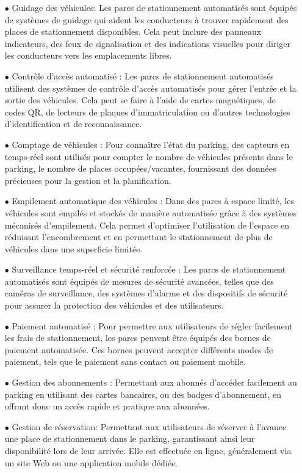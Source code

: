 \begin{enumerate}
   \item [$\bullet$]  Guidage des véhicules: Les parcs de stationnement automatisés sont équipés de systèmes de guidage qui aident les conducteurs à trouver rapidement des places de stationnement disponibles. Cela peut inclure des panneaux indicateurs, des feux de signalisation et des indications visuelles pour diriger les conducteurs vers les emplacements libres.
    \item [$\bullet$]  Contrôle d'accès automatisé : Les parcs de stationnement automatisés utilisent des systèmes de contrôle d'accès automatisés pour gérer l'entrée et la sortie des véhicules. Cela peut se faire à l'aide de cartes magnétiques, de codes QR, de lecteurs de plaques d'immatriculation ou d'autres technologies d'identification et de reconnaissance.
     \item [$\bullet$] Comptage de véhicules : Pour connaître l'état du parking, des capteurs en temps-réel sont utilisés pour compter le nombre de véhicules présents dans le parking, le nombre de places occupées/vacantes, fournissant des données précieuses pour la gestion et la planification.
   \item [$\bullet$] Empilement automatique des véhicules : Dans des parcs à espace limité, les véhicules sont empilés et stockés de manière automatisée grâce à des systèmes mécanisés d'empilement. Cela permet d'optimiser l'utilisation de l'espace en réduisant l'encombrement et en permettant le stationnement de plus de véhicules dans une superficie limitée.
    \item [$\bullet$] Surveillance temps-réel et sécurité renforcée : Les parcs de stationnement automatisés sont équipés de mesures de sécurité avancées, telles que des caméras de surveillance, des systèmes d'alarme et des dispositifs de sécurité pour assurer la protection des véhicules et des utilisateurs.
    \item [$\bullet$] Paiement automatisé : Pour permettre 
   aux utilisateurs de régler facilement les frais de stationnement, les parcs peuvent être équipés des bornes de paiement automatisée.
   Ces bornes peuvent accepter différents modes de paiement, tels que 
   le paiement sans contact ou paiement mobile.
   \item [$\bullet$] Gestion des abonnements : Permettant aux abonnés d'accéder facilement au parking en utilisant des cartes bancaires, ou des badges d'abonnement, en offrant donc  un accès rapide et pratique aux abonnées.
  \item [$\bullet$] Gestion de réservation: Permettant aux utilisateurs de réserver à l'avance une place de stationnement dans le parking, garantissant ainsi leur disponibilité lors de leur arrivée. Elle est effectuée en ligne, généralement via un site Web ou une application mobile dédiée.

\end{enumerate}
